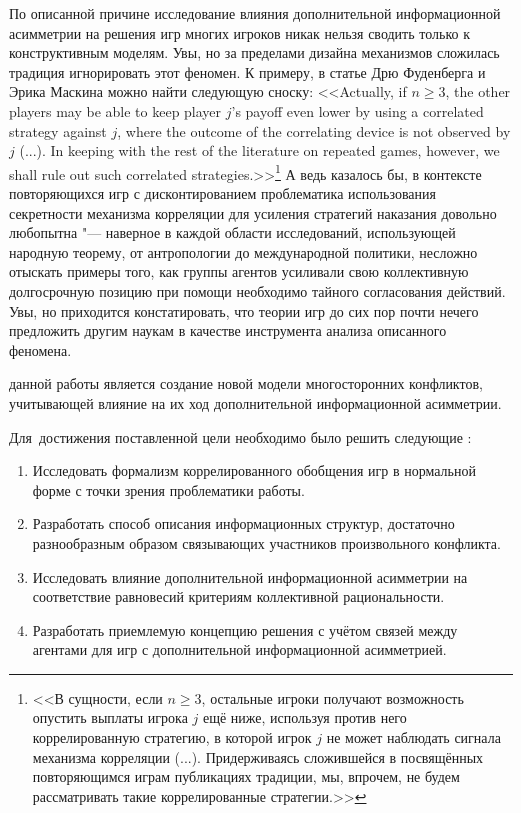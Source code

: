 По описанной причине исследование влияния дополнительной информационной асимметрии на решения игр многих игроков никак нельзя сводить только к конструктивным моделям. Увы, но за пределами дизайна механизмов сложилась традиция игнорировать этот феномен. К примеру, в статье \ifsynopsis\smartcite{Fudenberg}\else\cite{Fudenberg}\fi Дрю Фуденберга и Эрика Маскина можно найти следующую сноску: <<Actually, if $n \ge 3$, the other players may be able to keep player $j$'s payoff even lower by using a correlated strategy against $j$, where the outcome of the correlating device is not observed by $j$ (...). In keeping with the rest of the literature on repeated games, however, we shall rule out such correlated strategies.>>\footnote{<<В сущности, если $n \ge 3$, остальные игроки получают возможность опустить выплаты игрока $j$ ещё ниже, используя против него коррелированную стратегию, в которой игрок $j$ не может наблюдать сигнала механизма корреляции (...). Придерживаясь сложившейся в посвящённых повторяющимся играм публикациях традиции, мы, впрочем, не будем рассматривать такие коррелированные стратегии.>>} \ifsynopsis\else А ведь казалось бы, в контексте повторяющихся игр с дисконтированием проблематика использования секретности механизма корреляции для усиления стратегий наказания довольно любопытна "--- наверное в каждой области исследований, использующей народную теорему, от антропологии до международной политики, несложно отыскать примеры того, как группы агентов усиливали свою коллективную долгосрочную позицию при помощи необходимо тайного согласования действий. Увы, но приходится констатировать, что теории игр до сих пор почти нечего предложить другим наукам в качестве инструмента анализа описанного феномена. \fi


{\aim} данной работы является создание новой модели многосторонних конфликтов, учитывающей влияние на их ход дополнительной информационной асимметрии.

Для~достижения поставленной цели необходимо было решить следующие {\tasks}:
\begin{enumerate}[beginpenalty=10000] %
  \item Исследовать формализм коррелированного обобщения игр в нормальной форме с точки зрения проблематики работы.
  \item Разработать способ описания информационных структур, достаточно разнообразным образом связывающих участников произвольного конфликта.
  \item Исследовать влияние дополнительной информационной асимметрии на соответствие равновесий критериям коллективной рациональности.
  \item Разработать приемлемую концепцию решения с учётом связей между агентами для игр с дополнительной информационной асимметрией.
\end{enumerate}


